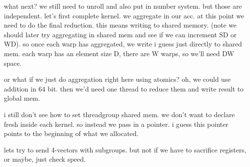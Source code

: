 what next?
we still need to unroll and also put in number system. but those are independent.
let's first complete kernel.
we aggregate in our acc. at this point we need to do the final reduction.
this means writing to shared memory. (note we should later try aggregating in shared mem and see if we can increment SD or WD).
so once each warp has aggregated, we write i guess just directly to shared mem. 
each warp has an element size D, there are W warps, so we'll need DW space. 

or what if we just do aggregation right here using atomics? oh, we could use addition in 64 bit. then we'd need one thread to reduce them and write result to global mem. 


i still don't see how to set threadgroup shared mem. we don't want to declare fresh inside each kernel. so instead we pass in a pointer. i guess this pointer points to the beginning of what we allocated. 



lets try to send 4-vectors with subgroups. but not if we have to sacrifice registers, or maybe, just check speed. 

